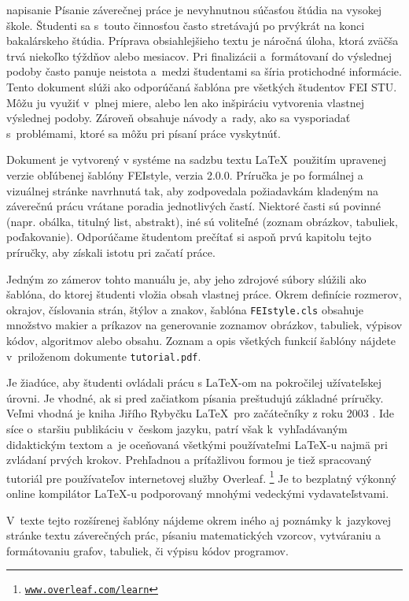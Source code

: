 napisanie 
Písanie záverečnej práce je nevyhnutnou súčasťou štúdia na vysokej škole.
Študenti sa s~touto činnosťou často stretávajú po prvýkrát na konci bakalárskeho štúdia.
Príprava obsiahlejšieho textu je náročná úloha,
ktorá zväčša trvá niekoľko týždňov alebo mesiacov.
Pri finalizácii a~formátovaní do výslednej podoby často panuje neistota a~medzi študentami sa šíria protichodné informácie.
Tento dokument slúži ako odporúčaná šablóna pre všetkých študentov FEI STU.
Môžu ju využiť v~plnej miere, alebo len ako inšpiráciu vytvorenia vlastnej výslednej podoby.
Zároveň obsahuje návody a~rady,
ako sa vysporiadať s~problémami,
ktoré sa môžu pri písaní práce vyskytnúť.

Dokument je vytvorený v systéme na sadzbu textu \LaTeX\ použitím upravenej verzie obľúbenej šablóny
FEIstyle, verzia 2.0.0. Príručka je po formálnej a vizuálnej stránke navrhnutá tak,
aby zodpovedala požiadavkám kladeným na záverečnú prácu vrátane poradia jednotlivých častí.
Niektoré časti sú povinné (napr. obálka, titulný list, abstrakt),
iné sú voliteľné (zoznam obrázkov, tabuliek, poďakovanie).
Odporúčame študentom prečítať si aspoň prvú kapitolu tejto príručky, aby získali istotu pri začatí práce.

Jedným zo zámerov tohto manuálu je,
aby jeho zdrojové súbory slúžili ako šablóna,
do ktorej študenti vložia obsah vlastnej práce.
Okrem definície rozmerov, okrajov, číslovania strán, štýlov a znakov, šablóna \verb|FEIstyle.cls| obsahuje množstvo makier a príkazov na generovanie zoznamov obrázkov, tabuliek, výpisov kódov, algoritmov alebo obsahu.
Zoznam a opis všetkých funkcií šablóny nájdete v~priloženom dokumente \verb|tutorial.pdf|.

Je žiadúce, aby študenti ovládali prácu s \LaTeX-om na pokročilej užívateľskej úrovni.
Je vhodné, ak si pred začiatkom písania preštudujú základné príručky. Veľmi vhodná je kniha
Jiřího Rybyčku \LaTeX\ pro začátečníky z roku 2003 \cite{Rybicka2003Latex}.
Ide síce o~staršiu publikáciu v~českom jazyku,
patrí však k~vyhľadávaným didaktickým textom
a~je oceňovaná všetkými používateľmi \LaTeX-u najmä pri zvládaní prvých krokov.
Prehľadnou a príťažlivou formou je tiež spracovaný tutoriál pre používateľov internetovej služby Overleaf.%
\footnote{\href{https://www.overleaf.com/learn}{\texttt{www.overleaf.com/learn}}}
Je to bezplatný výkonný online kompilátor \LaTeX-u podporovaný mnohými vedeckými vydavateľstvami.

V~texte tejto rozšírenej šablóny nájdeme okrem iného aj poznámky k~jazykovej stránke textu záverečných prác, písaniu matematických vzorcov, vytváraniu a formátovaniu grafov, tabuliek, či výpisu kódov programov.

